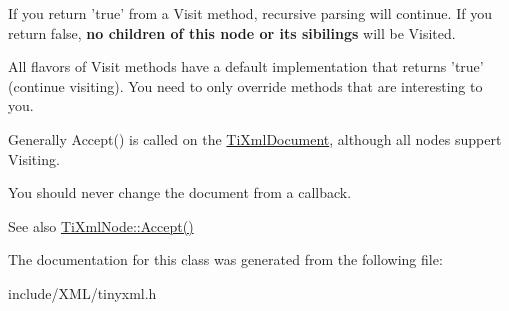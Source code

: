 If you return 'true' from a Visit method, recursive parsing will continue. If you return false, {\bfseries no children of this node or its sibilings} will be Visited.

All flavors of Visit methods have a default implementation that returns 'true' (continue visiting). You need to only override methods that are interesting to you.

Generally Accept() is called on the \hyperlink{class_ti_xml_document}{TiXmlDocument}, although all nodes suppert Visiting.

You should never change the document from a callback.

\begin{DoxySeeAlso}{See also}
\hyperlink{class_ti_xml_node_acc0f88b7462c6cb73809d410a4f5bb86}{TiXmlNode::Accept()} 
\end{DoxySeeAlso}


The documentation for this class was generated from the following file:\begin{DoxyCompactItemize}
\item 
include/XML/tinyxml.h\end{DoxyCompactItemize}
